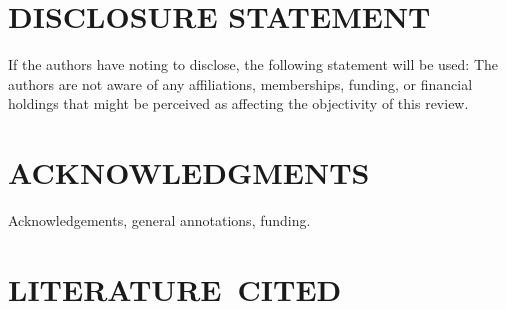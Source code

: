\documentclass[letterpaper]{ar-1col}
\begin{document}
% 
% 

\section*{DISCLOSURE STATEMENT}
If the authors have noting to disclose, the following statement will be used: The authors are not aware of any affiliations, memberships, funding, or financial holdings that
might be perceived as affecting the objectivity of this review. 

\section*{ACKNOWLEDGMENTS}
Acknowledgements, general annotations, funding.

%
\section*{LITERATURE\ CITED}








 

\end{document}
